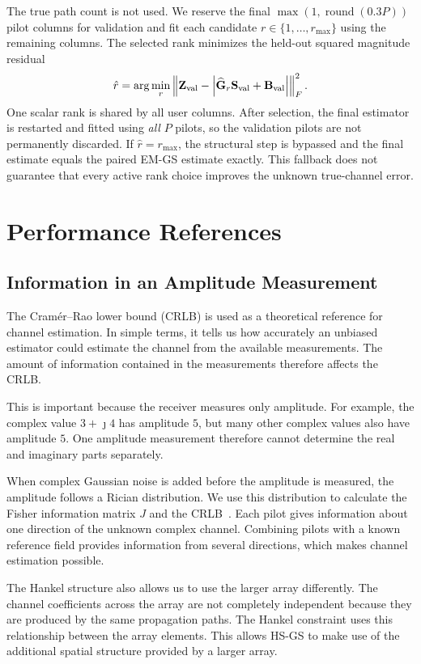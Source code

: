\documentclass[journal]{IEEEtran}
\newcommand{\bG}{\mathbf{G}}
\newcommand{\bS}{\mathbf{S}}
\newcommand{\bB}{\mathbf{B}}
\newcommand{\bZ}{\mathbf{Z}}
\begin{document}
The true path count is not used. We reserve the final
$\max(1,\operatorname{round}(0.3P))$ pilot columns for validation and fit
each candidate $r\in\{1,\ldots,r_{\max}\}$ using the remaining columns.
The selected rank minimizes the held-out squared magnitude residual
\begin{equation}
\hat r=\arg\min_r
\left\|\bZ_{\rm val}-
 \left|\widehat{\bG}_r\bS_{\rm val}+\bB_{\rm val}\right|\right\|_F^2.
\end{equation}
One scalar rank is shared by all user columns. After selection, the final
estimator is restarted and fitted using \emph{all} $P$ pilots, so the
validation pilots are not permanently discarded. If $\hat r=r_{\max}$,
the structural step is bypassed and the final estimate equals the paired
EM-GS estimate exactly. This fallback does not guarantee that every active
rank choice improves the unknown true-channel error.


\section{Performance References}
\label{sec:crlb}

\subsection{Information in an Amplitude Measurement}

The Cramér--Rao lower bound (CRLB) is used as a theoretical reference for
channel estimation. In simple terms, it tells us how accurately an
unbiased estimator could estimate the channel from the available
measurements. The amount of information contained in the measurements
therefore affects the CRLB.

This is important because the receiver measures only amplitude. For example,
the complex value $3+\jmath4$ has amplitude $5$, but many other complex values
also have amplitude $5$. One amplitude measurement therefore cannot determine
the real and imaginary parts separately.

When complex Gaussian noise is added before the amplitude is measured, the
amplitude follows a Rician distribution. We use this distribution to calculate
the Fisher information matrix $J$ and the CRLB~\cite{balan2015,cui2025}.
Each pilot gives information about one direction of the unknown complex
channel. Combining pilots with a known reference field provides information
from several directions, which makes channel estimation possible.

The Hankel structure also allows us to use the larger array differently.
The channel coefficients across the array are not completely independent
because they are produced by the same propagation paths. The Hankel
constraint uses this relationship between the array elements. This allows
HS-GS to make use of the additional spatial structure provided by a larger
array.
\end{document}
